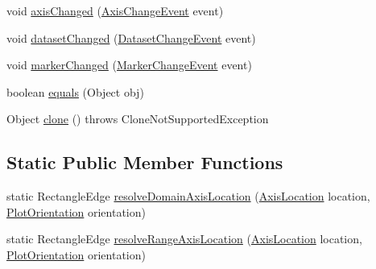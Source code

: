 \begin{DoxyCompactItemize}
\item 
void \mbox{\hyperlink{classorg_1_1jfree_1_1chart_1_1plot_1_1_plot_ab4541100d154f3585628f3d57fd9957d}{axis\+Changed}} (\mbox{\hyperlink{classorg_1_1jfree_1_1chart_1_1event_1_1_axis_change_event}{Axis\+Change\+Event}} event)
\item 
void \mbox{\hyperlink{classorg_1_1jfree_1_1chart_1_1plot_1_1_plot_ab94fcf91fa4d77787f3cb013a806ba07}{dataset\+Changed}} (\mbox{\hyperlink{classorg_1_1jfree_1_1data_1_1general_1_1_dataset_change_event}{Dataset\+Change\+Event}} event)
\item 
void \mbox{\hyperlink{classorg_1_1jfree_1_1chart_1_1plot_1_1_plot_ae13294cb202d066c55a18ec96b7b7622}{marker\+Changed}} (\mbox{\hyperlink{classorg_1_1jfree_1_1chart_1_1event_1_1_marker_change_event}{Marker\+Change\+Event}} event)
\item 
boolean \mbox{\hyperlink{classorg_1_1jfree_1_1chart_1_1plot_1_1_plot_a37e08b21e9d8f993385a73df0c87c2ea}{equals}} (Object obj)
\item 
Object \mbox{\hyperlink{classorg_1_1jfree_1_1chart_1_1plot_1_1_plot_ad62a9d38e405c0febc86607c677f79c7}{clone}} ()  throws Clone\+Not\+Supported\+Exception 
\end{DoxyCompactItemize}
\subsection*{Static Public Member Functions}
\begin{DoxyCompactItemize}
\item 
static Rectangle\+Edge \mbox{\hyperlink{classorg_1_1jfree_1_1chart_1_1plot_1_1_plot_a3bb144b028e0b183923086491f0e4617}{resolve\+Domain\+Axis\+Location}} (\mbox{\hyperlink{classorg_1_1jfree_1_1chart_1_1axis_1_1_axis_location}{Axis\+Location}} location, \mbox{\hyperlink{classorg_1_1jfree_1_1chart_1_1plot_1_1_plot_orientation}{Plot\+Orientation}} orientation)
\item 
static Rectangle\+Edge \mbox{\hyperlink{classorg_1_1jfree_1_1chart_1_1plot_1_1_plot_a13690293d7d15b8fdad8c230b87e5da1}{resolve\+Range\+Axis\+Location}} (\mbox{\hyperlink{classorg_1_1jfree_1_1chart_1_1axis_1_1_axis_location}{Axis\+Location}} location, \mbox{\hyperlink{classorg_1_1jfree_1_1chart_1_1plot_1_1_plot_orientation}{Plot\+Orientation}} orientation)
\end{DoxyCompactItemize}
